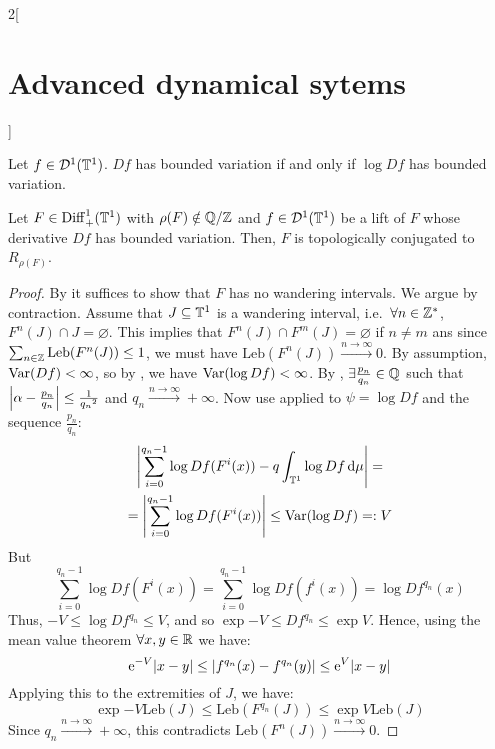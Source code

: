 \documentclass[../../../main_math.tex]{subfiles}
\begin{document}
\begin{multicols}{2}[\section{Advanced dynamical sytems}]
\begin{lemma}
    Let $f\in \mathcal{D}^1(\mathbb{T}^1)$. $Df$ has bounded variation if and only if $\log Df$ has bounded variation.
  \end{lemma}
  \begin{theorem}
    Let $F\in \mathrm{Diff}_+^1(\mathbb{T}^1)$ with $\rho(F)\notin\quot{\QQ}{\ZZ}$ and $f\in\mathcal{D}^1(\mathbb{T}^1)$ be a lift of $F$ whose derivative $Df$ has bounded variation. Then, $F$ is topologically conjugated to $R_{\rho(F)}$.
  \end{theorem}
  \begin{proof}
    By  it suffices to show that $F$ has no wandering intervals. We argue by contraction. Assume that $J\subseteq \mathbb{T}^1$ is a wandering interval, i.e.\ $\forall n\in\mathbb{Z}^*$, $F^n(J)\cap J=\varnothing$. This implies that $F^n(J) \cap F^m(J)=\varnothing$ if $n\ne m$ ans since $\sum_{n\in\mathbb{Z}}\text{Leb}(F^n(J))\leq 1$, we must have $\text{Leb}(F^n(J))\overset{n\to\infty}{\longrightarrow}0$. By assumption, $\mathrm{Var}(Df)<\infty$, so by , we have $\mathrm{Var}(\log Df) < \infty$.
    By , $\exists \frac{p_n}{q_n}\in\mathbb{Q}$ such that $\abs{\alpha-\frac{p_n}{q_n}}\leq \frac{1}{{q_n}^2}$ and $q_n\overset{n\to\infty}{\longrightarrow}+\infty$. Now use  applied to $\psi=\log Df$ and the sequence $\frac{p_n}{q_n}$:
    \begin{multline*}
      \abs{\sum_{i=0}^{q_n-1}\log Df(F^i(x))-q\int_{\mathbb{T}^1}\log Df\dd{\mu}}=\\=\abs{\sum_{i=0}^{q_n-1}\log Df(F^i(x))}\leq\mathrm{Var}(\log Df)=:V
    \end{multline*}
    But $$
      \sum_{i=0}^{q_n-1}\log Df(F^i(x))=\sum_{i=0}^{q_n-1}\log Df(f^i(x))=\log Df^{q_n}(x)
    $$
    Thus, $-V\leq \log Df^{q_n}\leq V$, and so $\exp{-V}\leq Df^{q_n}\leq \exp{V}$. Hence, using the mean value theorem $\forall x,y\in\mathbb{R}$ we have:
    $$
      \mathrm{e}^{-V}\abs{x-y}\leq \abs{f^{q_n}(x)-f^{q_n}(y)}\leq\mathrm{e}^{V}\abs{x-y}
    $$
    Applying this to the extremities of $J$, we have:
    $$
      \exp{-V}\text{Leb}(J)\leq \text{Leb}(F^{q_n}(J))\leq \exp{V}\text{Leb}(J)
    $$
    Since $q_n\overset{n\to\infty}{\longrightarrow}+\infty$, this contradicts $\text{Leb}(F^n(J))\overset{n\to\infty}{\longrightarrow}0$.
  \end{proof}
\end{multicols}
\end{document}
